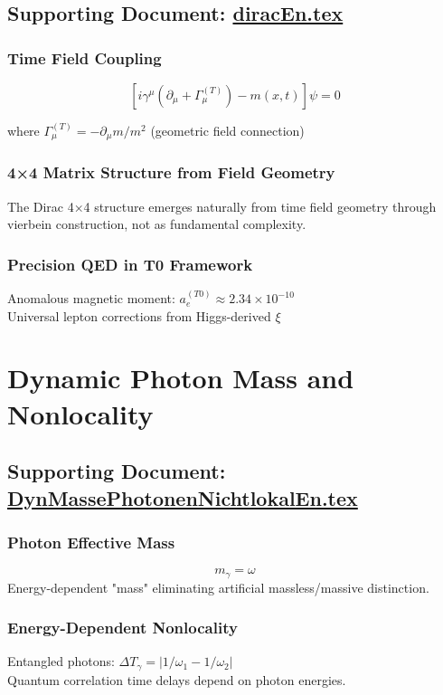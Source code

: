 \documentclass[12pt,a4paper]{report}
\begin{document}
	\subsection{Supporting Document: \href{https://github.com/jpascher/T0-Time-Mass-Duality/tree/main/2/pdf/diracEn.pdf}{diracEn.tex}}
	
	\subsubsection{Time Field Coupling}
	$$[i\gamma^\mu(\partial_\mu + \Gamma_\mu^{(T)}) - m(x,t)]\psi = 0$$
	
	where $\Gamma_\mu^{(T)} = -\partial_\mu m/m^2$ (geometric field connection)
	
	\subsubsection{4×4 Matrix Structure from Field Geometry}
	The Dirac 4×4 structure emerges naturally from time field geometry through vierbein construction, not as fundamental complexity.
	
	\subsubsection{Precision QED in T0 Framework}
	Anomalous magnetic moment: $a_e^{(T0)} \approx 2.34 \times 10^{-10}$\\
	Universal lepton corrections from Higgs-derived $\xi$
	
	\section{Dynamic Photon Mass and Nonlocality}
	\subsection{Supporting Document: \href{https://github.com/jpascher/T0-Time-Mass-Duality/tree/main/2/pdf/DynMassePhotonenNichtlokalEn.pdf}{DynMassePhotonenNichtlokalEn.tex}}
	
	\subsubsection{Photon Effective Mass}
	$$m_\gamma = \omega$$
	Energy-dependent "mass" eliminating artificial massless/massive distinction.
	
	\subsubsection{Energy-Dependent Nonlocality}
	Entangled photons: $\Delta T_\gamma = |1/\omega_1 - 1/\omega_2|$\\
	Quantum correlation time delays depend on photon energies.
	
\end{document}
